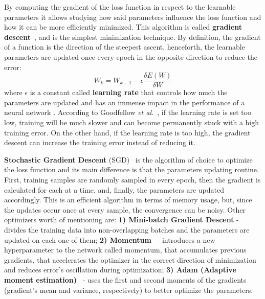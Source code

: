 \documentclass[class=report, crop=false, a4paper, 12pt]{standalone}
\begin{document}
\par By computing the gradient of the loss function in respect to the learnable parameters it allows studying how said parameters influence the loss function and how it can be more efficiently minimized. This algorithm is called \textbf{gradient descent}~\autocite{ruderOverviewGradientDescent}, and is the simplest minimization technique. By definition, the gradient of a function is the direction of the steepest ascent, henceforth, the learnable parameters are updated once every epoch in the opposite direction to reduce the error: 
$$
W_k = W_{k-1}-\epsilon\frac{\delta E(W)}{{\delta} W}
$$
\noindent where $\epsilon$ is a constant called \textbf{learning rate} that controls how much the parameters are updated and has an immense impact in the performance of a neural network . According to Goodfellow \textit{et al.}~\autocite{Goodfellow-et-al-2016}, if the learning rate is set too low, training will be much slower and can become permanently stuck with a high training error. On the other hand, if the learning rate is too high, the gradient descent can increase the training error instead of reducing it.
\par \textbf{Stochastic Gradient Descent} (SGD)~\autocite{alzubaidiReviewDeepLearning2021} is the algorithm of choice to optimize the loss function and its main difference is that the parameters updating routine. First, training samples are randomly sampled in every epoch, then the gradient is calculated for each at a time, and, finally, the parameters are updated accordingly. This is an efficient algorithm in terms of memory usage, but, since the updates occur once at every sample, the convergence can be noisy. Other optimizers worth of mentioning are: \textbf{1) Mini-batch Gradient Descent} - divides the training data into non-overlapping batches and the parameters are updated on each one of them; \textbf{2) Momentum}~\autocite{polyakMethodsSpeedingConvergence1964} - introduces a new hyperparameter to the network called momentum, that accumulates previous gradients, that accelerates the optimizer in the correct direction of minimization and reduces error's oscillation during optimization; \textbf{3) Adam (Adaptive moment estimation)}~\autocite{kingmaAdamMethodStochastic2015} - uses the first and second moments of the gradients (gradient's mean and variance, respectively) to better optimize the parameters.
\end{document}

